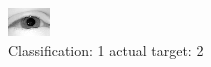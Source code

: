 \begin{figure}[h!]
\begin{center}
\includegraphics[width=0.60\columnwidth]{figures/ID2357_class_1_target_2.png}
\end{center}
\caption{ Classification: 1 actual target: 2}
\label{fig:ID2357_class_1_target_2}
\end{figure}
